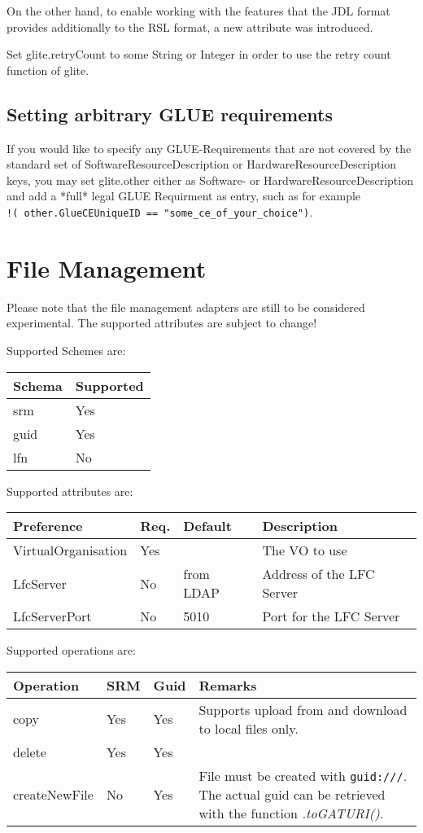 \documentclass{scrreprt}
\begin{document}
On the other hand, to enable working with the features that the JDL format provides additionally to
the RSL format, a new attribute was introduced.
 
Set glite.retryCount to some String or Integer in order to use the retry count function of glite.

\section{Setting arbitrary GLUE requirements}

If you would like to specify any GLUE-Requirements that are not covered by the standard set of 
SoftwareResourceDescription or HardwareResourceDescription keys, you may set glite.other either as
Software- or HardwareResourceDescription and add a *full* legal GLUE Requirment as entry, such as
for example \\ \verb+!( other.GlueCEUniqueID == "some_ce_of_your_choice")+.

\chapter{File Management}

Please note that the file management adapters are still to be
considered experimental. The supported attributes are subject to change!

Supported Schemes are:

\begin{tabular}{ll}
\bf Schema&\bf Supported\\\hline
srm&Yes\\
guid&Yes\\
lfn&No
\end{tabular}

Supported attributes are:

\begin{tabular}{lllp{6cm}}
\bf Preference&\bf Req.&\bf Default&\bf Description\\\hline
VirtualOrganisation&Yes&& The VO to use\\
LfcServer&No&from LDAP&Address of the LFC Server\\
LfcServerPort&No&5010&Port for the LFC Server
\end{tabular}

Supported operations are:

\begin{tabular}{lllp{6cm}}
\bf Operation&\bf SRM&\bf Guid&\bf Remarks\\\hline
copy&Yes&Yes&Supports upload from and download to local files only.\\
delete&Yes&Yes&\\
createNewFile&No&Yes&File must be created with {\tt guid:///}. The
actual guid can be retrieved with the function {\em .toGATURI()}.
\end{tabular}
\end{document}
